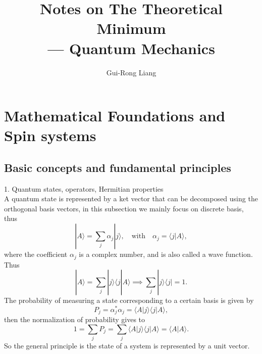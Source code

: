 \documentclass{article}
\title{Notes on The Theoretical Minimum\\
--- Quantum Mechanics}
\author{Gui-Rong Liang}
\newcommand{\be}{\begin{equation}}
\newcommand{\ee}{\end{equation}}
\newcommand{\1}{\left}
\newcommand{\2}{\right}
\newcommand{\la}{\langle}
\newcommand{\ra}{\rangle}
\newcommand{\al}{\alpha}
\begin{document}
\maketitle
\tableofcontents

\newpage

\section{Mathematical Foundations and Spin systems}
\subsection{Basic concepts and fundamental principles}
1. Quantum states, operators, Hermitian properties\\

A quantum state is represented by a ket vector that can be decomposed using the orthogonal basis vectors, in this subsection we mainly focus on discrete basis, thus 
\be
|A\ra=\sum_j \al_j|j\ra, \quad\text{with} \quad \al_j=\la j|A\ra,
\ee
where the coefficient $\al_j$ is a complex number, and is also called a wave function. Thus
\be
|A\ra=\sum_j |j\ra \la j|A\ra \implies  \sum_j |j\ra \la j|=1.
\ee
The probability of measuring a state corresponding to a certain basis is given by
\be
P_j=\al_j^*\al_j=\la A |j\ra \la j|A\ra,
\ee
then the normalization of probability gives to 
\be
1=\sum_j P_j=\sum_j\la A |j\ra \la j|A\ra=\la A|A\ra.
\ee
So the general principle is the state of a system is represented by a unit vector.\\
\end{document}
